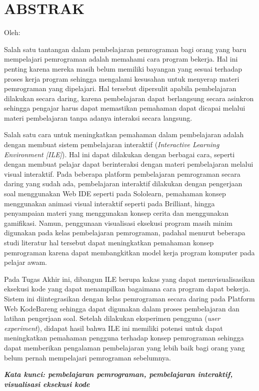\clearpage
\chapter*{ABSTRAK}

\begin{center}
  \center
  \large \bfseries \MakeUppercase{\thetitle}

  \normalfont\normalsize
  Oleh:

  \large \bfseries \theauthor
\end{center}

\vspace{1cm}

\begin{singlespace}
  Salah satu tantangan dalam pembelajaran pemrograman bagi orang yang baru mempelajari pemrograman adalah memahami cara program bekerja. Hal ini penting karena mereka masih belum memiliki bayangan yang sesuai terhadap proses kerja program sehingga mengalami kesusahan untuk menyerap materi pemrograman yang dipelajari. Hal tersebut dipersulit apabila pembelajaran dilakukan secara daring, karena pembelajaran dapat berlangsung secara asinkron sehingga pengajar harus dapat memastikan pemahaman dapat dicapai melalui materi pembelajaran tanpa adanya interaksi secara langsung.

  Salah satu cara untuk meningkatkan pemahaman dalam pembelajaran adalah dengan membuat sistem pembelajaran interaktif (\textit{Interactive Learning Environment [ILE]}). Hal ini dapat dilakukan dengan berbagai cara, seperti dengan membuat pelajar dapat berinteraksi dengan materi pembelajaran melalui visual interaktif. Pada beberapa platform pembelajaran pemrograman secara daring yang sudah ada, pembelajaran interaktif dilakukan dengan pengerjaan soal menggunakan Web IDE seperti pada Sololearn, pemahaman konsep menggunakan animasi visual interaktif seperti pada Brilliant, hingga penyampaian materi yang menggunakan konsep cerita dan menggunakan gamifikasi. Namun, penggunaan visualisasi eksekusi program masih minim digunakan pada kelas pembelajaran pemrograman, padahal menurut beberapa studi literatur hal tersebut dapat meningkatkan pemahaman konsep pemrograman karena dapat membangkitkan model kerja program komputer pada pelajar awam.

  Pada Tugas Akhir ini, dibangun ILE berupa kakas yang dapat memvisualisasikan eksekusi kode yang dapat menampilkan bagaimana cara program dapat bekerja. Sistem ini diintegrasikan dengan kelas pemrograman secara daring pada Platform Web KodeBareng sehingga dapat digunakan dalam proses pembelajaran dan latihan pengerjaan soal. Setelah dilakukan eksperimen pengguna (\textit{user experiment}), didapat hasil bahwa ILE ini memiliki potensi untuk dapat meningkatkan pemahaman pengguna terhadap konsep pemrograman sehingga dapat memberikan pengalaman pembelajaran yang lebih baik bagi orang yang belum pernah mempelajari pemrograman sebelumnya.
\end{singlespace}

\textbf{\textit{Kata kunci: pembelajaran pemrograman, pembelajaran interaktif, visualisasi eksekusi kode}}
\clearpage